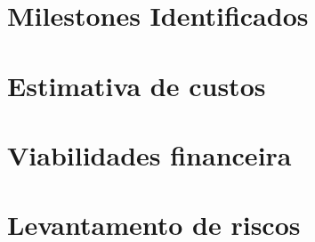 \section{Milestones Identificados}
\section{Estimativa de custos}
\section{Viabilidades financeira}
\section{Levantamento de riscos}

\begin{comment}
\begin{description}
	\item [Pré-textuais] \

	\begin{itemize}
		\item Capa
		\item Folha de rosto
		\item \textit{Dedicatória}
		\item \textit{Agradecimentos}
		\item \textit{Epígrafe}
		\item Resumo
		\item Abstract
		\item Lista de figuras
		\item Lista de tabelas
		\item Lista de símbolos e
		\item Sumário
	\end{itemize}

	\item [Textuais] \

	\begin{itemize}
		\item \textbf{\textit{Introdução}}
		\item \textbf{\textit{Desenvolvimento}}
		\item \textbf{\textit{Conclusões}}
	\end{itemize}

	\item [Pós-Textuais] \
	
	\begin{itemize}
		\item Referências bibliográficas
		\item \textit{Bibliografia}
		\item Anexos
		\item Contracapa
	\end{itemize}
\end{description}

\end{comment}

